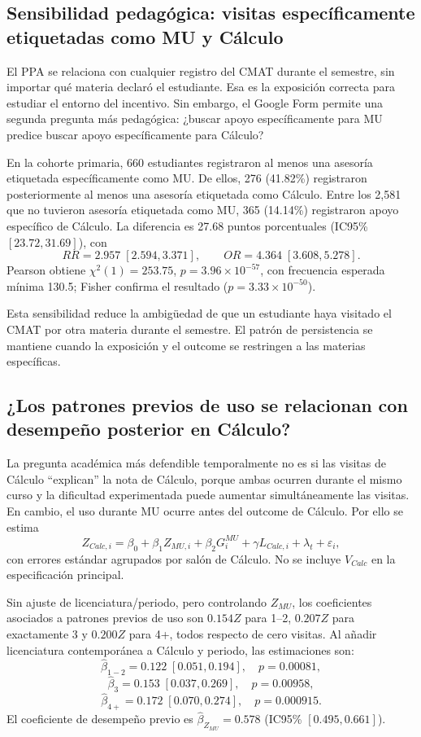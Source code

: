 \subsection{Sensibilidad pedagógica: visitas específicamente etiquetadas como MU y Cálculo}

El PPA se relaciona con cualquier registro del CMAT durante el semestre, sin importar qué materia declaró el estudiante. Esa es la exposición correcta para estudiar el entorno del incentivo. Sin embargo, el Google Form permite una segunda pregunta más pedagógica: ¿buscar apoyo específicamente para MU predice buscar apoyo específicamente para Cálculo?

En la cohorte primaria, 660 estudiantes registraron al menos una asesoría etiquetada específicamente como MU. De ellos, 276 (41.82\%) registraron posteriormente al menos una asesoría etiquetada como Cálculo. Entre los 2,581 que no tuvieron asesoría etiquetada como MU, 365 (14.14\%) registraron apoyo específico de Cálculo. La diferencia es 27.68 puntos porcentuales (IC95\% $[23.72,31.69]$), con
\[
RR=2.957\;[2.594,3.371],
\qquad
OR=4.364\;[3.608,5.278].
\]
Pearson obtiene $\chi^2(1)=253.75$, $p=3.96\times10^{-57}$, con frecuencia esperada mínima 130.5; Fisher confirma el resultado ($p=3.33\times10^{-50}$).

Esta sensibilidad reduce la ambigüedad de que un estudiante haya visitado el CMAT por otra materia durante el semestre. El patrón de persistencia se mantiene cuando la exposición y el outcome se restringen a las materias específicas.

\subsection{¿Los patrones previos de uso se relacionan con desempeño posterior en Cálculo?}

La pregunta académica más defendible temporalmente no es si las visitas de Cálculo ``explican'' la nota de Cálculo, porque ambas ocurren durante el mismo curso y la dificultad experimentada puede aumentar simultáneamente las visitas. En cambio, el uso durante MU ocurre antes del outcome de Cálculo. Por ello se estima
\[
Z_{Calc,i}
=\beta_0+\beta_1Z_{MU,i}+\beta_2G^{MU}_i+\gamma L_{Calc,i}+\lambda_t+\varepsilon_i,
\]
con errores estándar agrupados por salón de Cálculo. No se incluye $V_{Calc}$ en la especificación principal.

Sin ajuste de licenciatura/periodo, pero controlando $Z_{MU}$, los coeficientes asociados a patrones previos de uso son $0.154Z$ para 1--2, $0.207Z$ para exactamente 3 y $0.200Z$ para 4+, todos respecto de cero visitas. Al añadir licenciatura contemporánea a Cálculo y periodo, las estimaciones son:
\[
\widehat\beta_{1-2}=0.122\;[0.051,0.194],\quad p=0.00081,
\]
\[
\widehat\beta_{3}=0.153\;[0.037,0.269],\quad p=0.00958,
\]
\[
\widehat\beta_{4+}=0.172\;[0.070,0.274],\quad p=0.000915.
\]
El coeficiente de desempeño previo es $\widehat\beta_{Z_{MU}}=0.578$ (IC95\% $[0.495,0.661]$).

